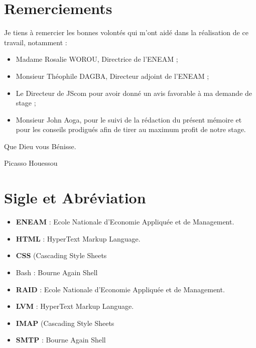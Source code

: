 \documentclass[a4paper,12pt,french]{report} %
\begin{document}
\chapter*{Remerciements}
	Je tiens à remercier les bonnes volontés qui m'ont aidé dans la réalisation de ce travail, notamment :
\begin{itemize}
	\item Madame Rosalie WOROU, Directrice de l'ENEAM ;
 	\item Monsieur Théophile DAGBA, Directeur adjoint de l'ENEAM ;
	\item Le Directeur de JScom pour avoir donné un avis favorable à ma demande de stage ;
	\item Monsieur John Aoga, pour le suivi de la rédaction du présent mémoire et pour les conseils prodigués afin de tirer au maximum profit de notre stage.	
\end{itemize}
Que Dieu vous Bénisse.
\begin{flushright}
Picasso Houessou
\end{flushright}

\chapter*{Sigle et Abréviation}
\begin{itemize}
\item[] \textbf{ENEAM} : Ecole Nationale d'Economie Appliquée et de Management. 
\item[] \textbf{HTML} : HyperText Markup Language. %
\item[] \textbf{CSS} (Cascading Style Sheets
\item[] Bash : Bourne Again Shell
\item[] \textbf{RAID} : Ecole Nationale d'Economie Appliquée et de Management. 
\item[] \textbf{LVM} : HyperText Markup Language. %
\item[] \textbf{IMAP} (Cascading Style Sheets
\item[] \textbf{SMTP} : Bourne Again Shell
\end{itemize}

\renewcommand{\contentsname}{Table des matières}
\tableofcontents

\listoffigures
\onehalfspacing %
\end{document}
